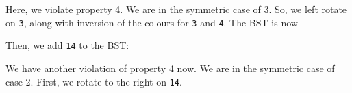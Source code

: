 \documentclass[a4paper, openany]{memoir}
\begin{document}
\begin{center}
\end{center}
Here, we violate property 4. We are in the symmetric case of 3. So, we left rotate on \texttt{3}, along with inversion of the colours for \texttt{3} and \texttt{4}. The BST is now
\begin{center}
\end{center}
Then, we add \texttt{14} to the BST:
\begin{center}
\end{center}
We have another violation of property 4 now. We are in the symmetric case of case 2. First, we rotate to the right on \texttt{14}.
\end{document}
